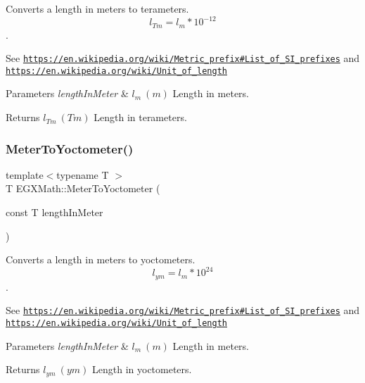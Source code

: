 Converts a length in meters to terameters. \[ l_{Tm}=l_{m} * 10^{-12} \]. 

See \href{https://en.wikipedia.org/wiki/Metric_prefix#List_of_SI_prefixes}{\tt https\+://en.\+wikipedia.\+org/wiki/\+Metric\+\_\+prefix\#\+List\+\_\+of\+\_\+\+S\+I\+\_\+prefixes} and \href{https://en.wikipedia.org/wiki/Unit_of_length}{\tt https\+://en.\+wikipedia.\+org/wiki/\+Unit\+\_\+of\+\_\+length} 
\begin{DoxyParams}{Parameters}
{\em length\+In\+Meter} & $ l_{m}\ (m)$ Length in meters. \\
\hline
\end{DoxyParams}
\begin{DoxyReturn}{Returns}
$ l_{Tm}\ (Tm)$ Length in terameters. 
\end{DoxyReturn}
\mbox{\label{group___e_g_x_math-_conversions-_length_conversions-_s_i-_meter-_s_i_ga0a9af3add4234d53c0ea30906ead1c3a}} 
\subsubsection{\texorpdfstring{Meter\+To\+Yoctometer()}{MeterToYoctometer()}}
{\footnotesize\ttfamily template$<$typename T $>$ \\
T E\+G\+X\+Math\+::\+Meter\+To\+Yoctometer (\begin{DoxyParamCaption}\item[{const T}]{length\+In\+Meter }\end{DoxyParamCaption})}



Converts a length in meters to yoctometers. \[ l_{ym}=l_{m} * 10^{24} \]. 

See \href{https://en.wikipedia.org/wiki/Metric_prefix#List_of_SI_prefixes}{\tt https\+://en.\+wikipedia.\+org/wiki/\+Metric\+\_\+prefix\#\+List\+\_\+of\+\_\+\+S\+I\+\_\+prefixes} and \href{https://en.wikipedia.org/wiki/Unit_of_length}{\tt https\+://en.\+wikipedia.\+org/wiki/\+Unit\+\_\+of\+\_\+length} 
\begin{DoxyParams}{Parameters}
{\em length\+In\+Meter} & $ l_{m}\ (m)$ Length in meters. \\
\hline
\end{DoxyParams}
\begin{DoxyReturn}{Returns}
$ l_{ym}\ (ym)$ Length in yoctometers. 
\end{DoxyReturn}
\mbox{\label{group___e_g_x_math-_conversions-_length_conversions-_s_i-_meter-_s_i_ga53fdb093b4572363a0ae9be4ced2ecb4}} 

